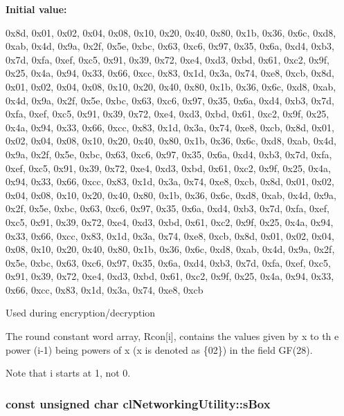 \label{classcl_networking_utility_af4c64288219ccb6c22d3ea07ec19b291}
{\bfseries Initial value:}
\begin{DoxyCode}

        {
                0x8d, 0x01, 0x02, 0x04, 0x08, 0x10, 0x20, 0x40, 0x80, 0x1b, 0x36,
       0x6c, 0xd8, 0xab, 0x4d, 0x9a, 
                0x2f, 0x5e, 0xbc, 0x63, 0xc6, 0x97, 0x35, 0x6a, 0xd4, 0xb3, 0x7d,
       0xfa, 0xef, 0xc5, 0x91, 0x39, 
                0x72, 0xe4, 0xd3, 0xbd, 0x61, 0xc2, 0x9f, 0x25, 0x4a, 0x94, 0x33,
       0x66, 0xcc, 0x83, 0x1d, 0x3a, 
                0x74, 0xe8, 0xcb, 0x8d, 0x01, 0x02, 0x04, 0x08, 0x10, 0x20, 0x40,
       0x80, 0x1b, 0x36, 0x6c, 0xd8, 
                0xab, 0x4d, 0x9a, 0x2f, 0x5e, 0xbc, 0x63, 0xc6, 0x97, 0x35, 0x6a,
       0xd4, 0xb3, 0x7d, 0xfa, 0xef, 
                0xc5, 0x91, 0x39, 0x72, 0xe4, 0xd3, 0xbd, 0x61, 0xc2, 0x9f, 0x25,
       0x4a, 0x94, 0x33, 0x66, 0xcc, 
                0x83, 0x1d, 0x3a, 0x74, 0xe8, 0xcb, 0x8d, 0x01, 0x02, 0x04, 0x08,
       0x10, 0x20, 0x40, 0x80, 0x1b, 
                0x36, 0x6c, 0xd8, 0xab, 0x4d, 0x9a, 0x2f, 0x5e, 0xbc, 0x63, 0xc6,
       0x97, 0x35, 0x6a, 0xd4, 0xb3, 
                0x7d, 0xfa, 0xef, 0xc5, 0x91, 0x39, 0x72, 0xe4, 0xd3, 0xbd, 0x61,
       0xc2, 0x9f, 0x25, 0x4a, 0x94, 
                0x33, 0x66, 0xcc, 0x83, 0x1d, 0x3a, 0x74, 0xe8, 0xcb, 0x8d, 0x01,
       0x02, 0x04, 0x08, 0x10, 0x20, 
                0x40, 0x80, 0x1b, 0x36, 0x6c, 0xd8, 0xab, 0x4d, 0x9a, 0x2f, 0x5e,
       0xbc, 0x63, 0xc6, 0x97, 0x35, 
                0x6a, 0xd4, 0xb3, 0x7d, 0xfa, 0xef, 0xc5, 0x91, 0x39, 0x72, 0xe4,
       0xd3, 0xbd, 0x61, 0xc2, 0x9f, 
                0x25, 0x4a, 0x94, 0x33, 0x66, 0xcc, 0x83, 0x1d, 0x3a, 0x74, 0xe8,
       0xcb, 0x8d, 0x01, 0x02, 0x04, 
                0x08, 0x10, 0x20, 0x40, 0x80, 0x1b, 0x36, 0x6c, 0xd8, 0xab, 0x4d,
       0x9a, 0x2f, 0x5e, 0xbc, 0x63, 
                0xc6, 0x97, 0x35, 0x6a, 0xd4, 0xb3, 0x7d, 0xfa, 0xef, 0xc5, 0x91,
       0x39, 0x72, 0xe4, 0xd3, 0xbd, 
                0x61, 0xc2, 0x9f, 0x25, 0x4a, 0x94, 0x33, 0x66, 0xcc, 0x83, 0x1d,
       0x3a, 0x74, 0xe8, 0xcb
        }
\end{DoxyCode}
Used during encryption/decryption \par
 The round constant word array, Rcon\mbox{[}i\mbox{]}, contains the values given by x to th e power (i-\/1) being powers of x (x is denoted as \{02\}) in the field GF(28). \par
 Note that i starts at 1, not 0. \hypertarget{classcl_networking_utility_af84431055c223f65227359514898c157}{
\subsubsection[{sBox}]{\setlength{\rightskip}{0pt plus 5cm}const unsigned char {\bf clNetworkingUtility::sBox}}}
